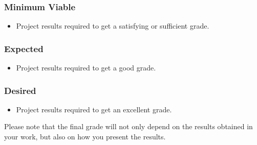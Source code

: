 \documentclass[rnd]{mas_proposal}
\begin{document}
\subsubsection*{Minimum Viable}
\begin{itemize}
    \item Project results required to get a satisfying or sufficient grade.
\end{itemize}

\subsubsection*{Expected}
\begin{itemize}
    \item Project results required to get a good grade.
\end{itemize}

\subsubsection*{Desired}
\begin{itemize}
    \item Project results required to get an excellent grade.
\end{itemize}

Please note that the final grade will not only depend on the results obtained in your work, but also on how you present the results.

\nocite{*}

\end{document}
